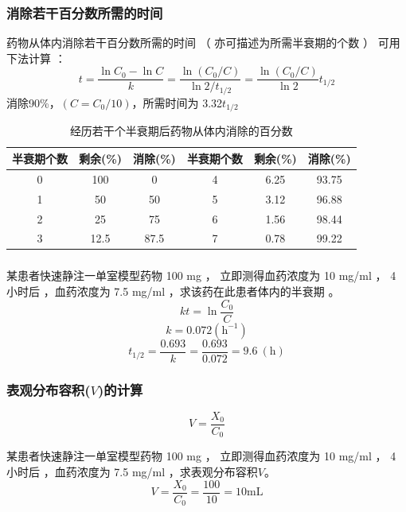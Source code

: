 \documentclass[dvipsnames, svgnames, x11names]{beamer}
\begin{document}
\begin{frame}[t]
    \frametitle{消除若干百分数所需的时间}    
    药物从体内消除若干百分数所需的时间 （ 亦可描述为所需半衰期的个数 ） 可用下法计算 ：
    \[
        t=\frac{\ln C_{0}-\ln C}{k}=\frac{\ln(C_{0}/C)}{\ln2/t_{1/2}}=\frac{\ln(C_{0}/C)}{\ln2}t_{1/2}
    \]
    消除90\%，$(C=C_{0}/10)$，所需时间为 3.32$t_{1/2}$
    \begin{table}
        \centering
        \begin{tabular}{ccc|ccc}
            \bottomrule
            半衰期个数 & 剩余(\%) & 消除(\%) & 半衰期个数 & 剩余(\%) & 消除(\%) \\ \hline
            0 & 100 & 0 & 4 & 6.25 & 93.75 \\ 
            1 & 50 & 50 & 5 & 3.12 & 96.88 \\
            2 & 25 & 75 & 6 & 1.56 & 98.44 \\
            3 & 12.5 & 87.5 & 7 & 0.78 & 99.22 \\ \toprule
        \end{tabular}
        \caption{经历若干个半衰期后药物从体内消除的百分数}
    \end{table}
\end{frame}


\begin{frame}[t]
    \frametitle{}
    \begin{example}
        某患者快速静注一单室模型药物 100 mg ， 立即测得血药浓度为 10 mg/ml ， 4 小时后 ，血药浓度为 7.5 mg/ml ，求该药在此患者体内的半衰期 。
        \tcblower
        \pause
        \[
            kt=\ln\frac{C_{0}}{C}
        \]
        \[
            k=0.072(\mathrm{h}^{-1})
        \]
        \[
            t_{1/2}=\frac{0.693}k=\frac{0.693}{0.072}=9.6\mathrm{~(h)}
        \]
    \end{example}
\end{frame}


\begin{frame}[t]
    \frametitle{表观分布容积($V$)的计算}
    \[
        V = \frac{X_0}{C_0}
    \]
    \begin{example}
        某患者快速静注一单室模型药物 100 mg ， 立即测得血药浓度为 10 mg/ml ， 4 小时后 ，血药浓度为 7.5 mg/ml ，求表观分布容积$V$。
        \tcblower
        \[
            V = \frac{X_0}{C_0} = \frac{100}{10} = 10 \mathrm{mL}
        \]
        \pause
    \end{example}
\end{frame}
\end{document}
